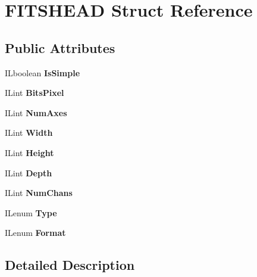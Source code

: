 \hypertarget{structFITSHEAD}{}\section{F\+I\+T\+S\+H\+E\+AD Struct Reference}
\label{structFITSHEAD}
\subsection*{Public Attributes}
\begin{DoxyCompactItemize}
\item 
\mbox{\label{structFITSHEAD_a3f309311151bfee02c6063048088e728}} 
I\+Lboolean {\bfseries Is\+Simple}
\item 
\mbox{\label{structFITSHEAD_a41fd3391f357c24281930357f4beb509}} 
I\+Lint {\bfseries Bits\+Pixel}
\item 
\mbox{\label{structFITSHEAD_a5714f2a545b3d6fb690a840758ea33ef}} 
I\+Lint {\bfseries Num\+Axes}
\item 
\mbox{\label{structFITSHEAD_a6006f8a93a64b3f1e50ba924cff29a5e}} 
I\+Lint {\bfseries Width}
\item 
\mbox{\label{structFITSHEAD_a3c40dfa3d7ae273f895e0210443b6776}} 
I\+Lint {\bfseries Height}
\item 
\mbox{\label{structFITSHEAD_adacb27c796d622189ee6fb54470d0800}} 
I\+Lint {\bfseries Depth}
\item 
\mbox{\label{structFITSHEAD_a173b17e83298676ba9a5f1584aed899b}} 
I\+Lint {\bfseries Num\+Chans}
\item 
\mbox{\label{structFITSHEAD_ae01eb4ecdd3aedd04aebb9735d3205cb}} 
I\+Lenum {\bfseries Type}
\item 
\mbox{\label{structFITSHEAD_a3afeffe59a85d2f6d9e0f62050022289}} 
I\+Lenum {\bfseries Format}
\end{DoxyCompactItemize}


\subsection{Detailed Description}


